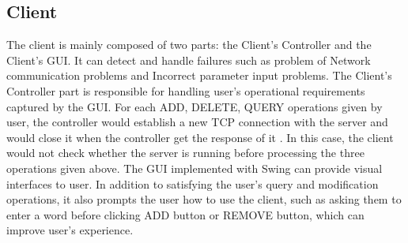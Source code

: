 \documentclass[a4paper]{article}
\begin{document}
\subsection{Client}
The client is mainly composed of two parts: the Client’s Controller and the Client’s GUI. It can detect and handle failures such as problem of Network communication problems and Incorrect parameter input problems. The Client’s Controller part is responsible for handling user’s operational requirements captured by the GUI. For each ADD, DELETE, QUERY operations given by user, the controller would establish a new TCP connection with the server and would close it when the controller get the response of it . In this case, the client would not check whether the server is running before processing the three operations given above. The GUI implemented with Swing can provide visual interfaces to user. In addition to satisfying the user’s query and modification operations, it also prompts the user how to use the client, such as asking them to enter a word before clicking ADD button or REMOVE button, which can improve user’s experience.

\section{}

\end{document}
